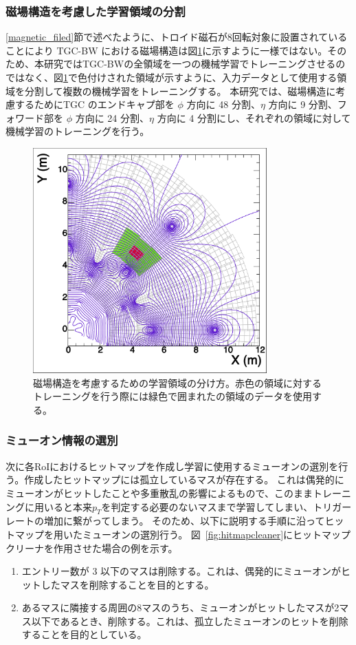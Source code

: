 \subsubsection{磁場構造を考慮した学習領域の分割}
\ref{magnetic_filed}節で述べたように、トロイド磁石が8回転対象に設置されていることにより TGC-BW における磁場構造は図\ref{fig:Mag}に示すように一様ではない。そのため、本研究ではTGC-BWの全領域を一つの機械学習でトレーニングさせるのではなく、図\ref{fig:Mag}で色付けされた領域が示すように、入力データとして使用する領域を分割して複数の機械学習をトレーニングする。
本研究では、磁場構造に考慮するためにTGC のエンドキャプ部を $\phi$ 方向に 48 分割、$\eta$ 方向に 9 分割、フォワード部を $\phi$ 方向に 24 分割、$\eta$ 方向に 4 分割にし、それぞれの領域に対して機械学習のトレーニングを行う。
\begin{figure}[tb]
  \centering
  \includegraphics[clip, width=9cm]{fig/4/c1_withMag.pdf}
  \caption{磁場構造を考慮するための学習領域の分け方。赤色の領域に対するトレーニングを行う際には緑色で囲まれたの領域のデータを使用する。}
  \label{fig:Mag}
\end{figure}

\subsubsection{ミューオン情報の選別}
次に各RoIにおけるヒットマップを作成し学習に使用するミューオンの選別を行う。作成したヒットマップには孤立しているマスが存在する。
これは偶発的にミューオンがヒットしたことや多重散乱の影響によるもので、このままトレーニングに用いると本来$p_T$を判定する必要のないマスまで学習してしまい、トリガーレートの増加に繋がってしまう。
そのため、以下に説明する手順に沿ってヒットマップを用いたミューオンの選別行う。
図~\ref{fig:hitmapcleaner}にヒットマップクリーナを作用させた場合の例を示す。
\begin{enumerate}
   \item エントリー数が 3 以下のマスは削除する。これは、偶発的にミューオンがヒットしたマスを削除することを目的とする。
   \item あるマスに隣接する周囲の8マスのうち、ミューオンがヒットしたマスが2マス以下であるとき、削除する。これは、孤立したミューオンのヒットを削除することを目的としている。
\end{enumerate}


